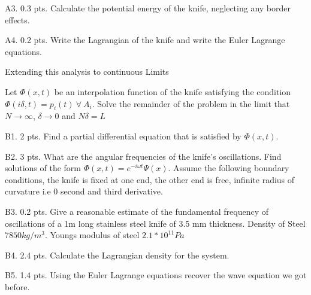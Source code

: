 \begin{subpr}{A3. \hfill 0.3 pts.} Calculate the potential energy of the knife, neglecting any border effects.
\end{subpr}
\begin{subpr}{A4. \hfill 0.2 pts.} Write the Lagrangian of the knife and write the Euler Lagrange equations. 
\end{subpr}

\begin{problem}{Extending this analysis to continuous Limits}

Let $\Phi(x,t)$ be an interpolation function of the knife satisfying the condition $\Phi(i \delta, t)=p_i(t) \  \forall \ A_i$. Solve the remainder of the problem in the limit that $N \to \infty$, $\delta \to 0$ and $N\delta=L$
\end{problem}

\begin{subpr}{B1. \hfill 2 pts.}
Find a partial differential equation that is satisfied by $\Phi(x,t)$.
\end{subpr}

\begin{subpr}{B2. \hfill 3 pts.} What are the angular frequencies of the knife's oscillations. \newline
Find solutions of the form $\Phi(x,t)=e^{-i\omega t}\Psi(x)$. Assume the following boundary conditions, the knife is fixed at one end, the other end is free, infinite radius of curvature i.e 0 second and third derivative.
\end{subpr}
\begin{subpr}{B3. \hfill 0.2 pts.} Give a reasonable estimate of the fundamental frequency of oscillations of a 1m long stainless steel knife of 3.5 mm thickness. Density of Steel $7850 kg/m^3$. Youngs modulus of steel $2.1*10^{11} Pa$
\end{subpr}
\begin{subpr}{B4. \hfill 2.4 pts.}  Calculate the Lagrangian density for the system.
\end{subpr}
\begin{subpr}{B5. \hfill 1.4 pts.} Using the Euler Lagrange equations recover the wave equation we got before.
\end{subpr}

\clearpage